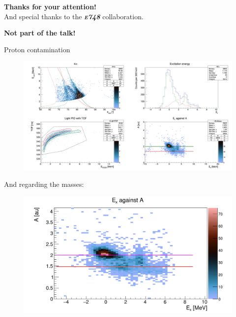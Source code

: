 \documentclass[sans,
frameno, %
mp,
usenames,dvipsnames, %
onlytextwidth, %
t,%
11pt]{beamer}
\begin{document}
\End
\begin{frame}
    \centering
    \textbf{Thanks for your attention!}\\
    And special thanks to the \textbf{\itshape\scshape e748} collaboration.
\end{frame}

\begin{frame}
    \centering
    \textbf{Not part of the talk!}
\end{frame}

\begin{frame}[c]{Proton contamination}
    \only<+>
    {
        \begin{figure}
            \centering
            \includegraphics[width=1.05\linewidth]{figures/Workshop/proton_contamination.png}
        \end{figure}
    }
    \only<+>
    {
        And regarding the masses:
        \begin{figure}
            \begin{minipage}[t]{0.48\linewidth}
                \centering
                \includegraphics[width=\textwidth]{figures/Workshop/ex_mass_all.png}

\end{minipage}
\end{figure}}
\end{frame}
\end{document}
